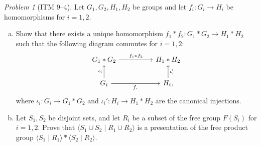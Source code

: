 \documentclass[11pt,twoside]{amsart}
\theoremstyle{plain}
\theoremstyle{remark}
\newtheorem{prob}{Problem}
\theoremstyle{definition}
\theoremstyle{definition}
\begin{document}
\begin{prob}[ITM 9--4]
Let $G_1,G_2,H_1,H_2$ be groups and let $f_i\colon G_i\to H_i$ be homomorphisms for $i=1,2$.
\begin{enumerate}[(a)]
\item Show that there exists a unique homomorphism $f_1*f_2\colon G_1*G_2\to H_1*H_2$ such that the following diagram commutes for $i=1,2$:
\[\begin{tikzcd}
	{G_1*G_2} && {H_1*H_2} \\
	{G_i} && {H_i,}
	\arrow["{f_1*f_2}", from=1-1, to=1-3]
	\arrow["{f_i}"', from=2-1, to=2-3]
	\arrow["{\iota_i}", from=2-1, to=1-1]
	\arrow["{\iota_i'}"', from=2-3, to=1-3]
\end{tikzcd}\]
where $\iota_i\colon G_i\to G_1*G_2$ and $\iota_i'\colon H_i\to H_1*H_2$ are the canonical injections.
\item Let $S_1,S_2$ be disjoint sets, and let $R_i$ be a subset of the free group $F(S_i)$ for $i=1,2$. Prove that $\langle S_1\cup S_2\mid R_1\cup R_2\rangle$ is a presentation of the free product group $\langle S_1\mid R_1\rangle * \langle S_2\mid R_2\rangle$.
\end{enumerate}
\end{prob}
\end{document}

